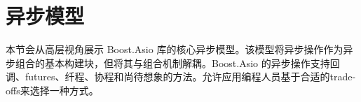 \section{异步模型}
本节会从高层视角展示 Boost.Asio 库的核心异步模型。该模型将异步操作作为异步组合的基本构建块，但将其与组合机制解耦。Boost.Asio 的异步操作支持回调、futures、纤程、协程和尚待想象的方法。允许应用编程人员基于合适的trade-offs来选择一种方式。






